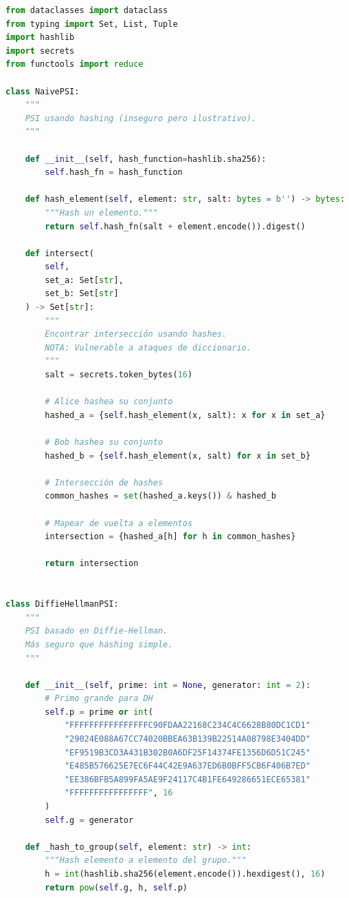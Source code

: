 \documentclass[11pt,a4paper,twoside]{book}
\theoremstyle{definition}
\theoremstyle{remark}
\begin{document}
\begin{lstlisting}[language=Python, caption={Implementación de Private Set Intersection}]
from dataclasses import dataclass
from typing import Set, List, Tuple
import hashlib
import secrets
from functools import reduce

class NaivePSI:
    """
    PSI usando hashing (inseguro pero ilustrativo).
    """
    
    def __init__(self, hash_function=hashlib.sha256):
        self.hash_fn = hash_function
    
    def hash_element(self, element: str, salt: bytes = b'') -> bytes:
        """Hash un elemento."""
        return self.hash_fn(salt + element.encode()).digest()
    
    def intersect(
        self,
        set_a: Set[str],
        set_b: Set[str]
    ) -> Set[str]:
        """
        Encontrar intersección usando hashes.
        NOTA: Vulnerable a ataques de diccionario.
        """
        salt = secrets.token_bytes(16)
        
        # Alice hashea su conjunto
        hashed_a = {self.hash_element(x, salt): x for x in set_a}
        
        # Bob hashea su conjunto
        hashed_b = {self.hash_element(x, salt) for x in set_b}
        
        # Intersección de hashes
        common_hashes = set(hashed_a.keys()) & hashed_b
        
        # Mapear de vuelta a elementos
        intersection = {hashed_a[h] for h in common_hashes}
        
        return intersection


class DiffieHellmanPSI:
    """
    PSI basado en Diffie-Hellman.
    Más seguro que hashing simple.
    """
    
    def __init__(self, prime: int = None, generator: int = 2):
        # Primo grande para DH
        self.p = prime or int(
            "FFFFFFFFFFFFFFFFC90FDAA22168C234C4C6628B80DC1CD1"
            "29024E088A67CC74020BBEA63B139B22514A08798E3404DD"
            "EF9519B3CD3A431B302B0A6DF25F14374FE1356D6D51C245"
            "E485B576625E7EC6F44C42E9A637ED6B0BFF5CB6F406B7ED"
            "EE386BFB5A899FA5AE9F24117C4B1FE649286651ECE65381"
            "FFFFFFFFFFFFFFFF", 16
        )
        self.g = generator
    
    def _hash_to_group(self, element: str) -> int:
        """Hash elemento a elemento del grupo."""
        h = int(hashlib.sha256(element.encode()).hexdigest(), 16)
        return pow(self.g, h, self.p)
    

\end{lstlisting}
\end{document}
